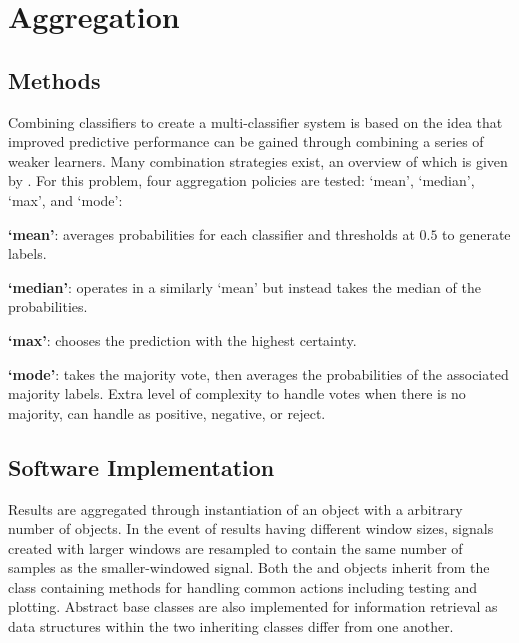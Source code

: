 \section{Aggregation}
\label{sec:pl-agg}
    
    \subsection{Methods}
    \label{subsec:pl-agg-methods}
        Combining classifiers to create a multi-classifier system is based on the idea that improved predictive performance can be gained through combining a series of weaker learners. Many combination strategies exist, an overview of which is given by \textcite{Suen2000}. For this problem, four aggregation policies are tested: `mean', `median', `max', and `mode':
        \begin{sitemize}
            \item\textbf{`mean'}: averages probabilities for each classifier and thresholds at $0.5$ to generate labels. 
            \item\textbf{`median'}: operates in a similarly `mean' but instead takes the median of the probabilities. 
            \item\textbf{`max'}: chooses the prediction with the highest certainty.
            \item\textbf{`mode'}: takes the majority vote, then averages the probabilities of the associated majority labels. Extra level of complexity to handle votes when there is no majority, can handle as positive, negative, or reject.
        \end{sitemize}
        
    \subsection{Software Implementation}
    \label{subsec:pl-agg-software}
        Results are aggregated through instantiation of an  object with a arbitrary number of  objects. In the event of results having different window sizes, signals created with larger windows are resampled to contain the same number of samples as the smaller-windowed signal. Both the  and  objects inherit from the  class containing methods for handling common actions including testing and plotting. Abstract base classes are also implemented for information retrieval as data structures within the two inheriting classes differ from one another.